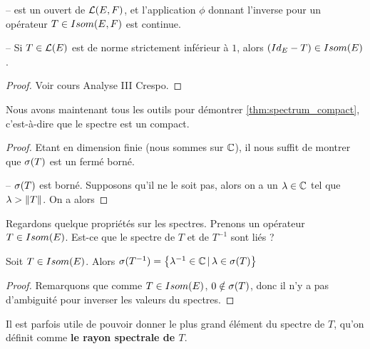 \begin{proposition}
	--  est un ouvert de $\mathcal{L}(E, F)$, et
	l'application $\phi$ donnant l'inverse pour un opérateur $T \in
	Isom(E, F)$ est continue.

	-- Si $T \in \mathcal{L}(E)$ est de norme strictement inférieur à $1$,
	alors $(Id_{E} - T) \in Isom(E)$.
\end{proposition}

\begin{proof}
	Voir cours Analyse III Crespo.
\end{proof}

Nous avons maintenant tous les outils pour démontrer
\ref{thm:spectrum_compact}, c'est-à-dire que le spectre est un compact.

\begin{proof}
	Etant en dimension finie (nous sommes sur $\mathbb{C}$), il nous suffit de
	montrer que $\sigma(T)$ est un fermé borné.

	-- $\sigma(T)$ est borné. Supposons qu'il ne le soit pas, alors on a un
	$\lambda \in \mathbb{C}$ tel que $\lambda > \norm{T}$. On a alors 
\end{proof}


Regardons quelque propriétés sur les spectres. Prenons un opérateur $T \in
Isom(E)$. Est-ce que le spectre de $T$ et de $T^{-1}$ sont liés ?

\begin{proposition}
	Soit $T \in Isom(E)$. Alors $\sigma(T^{-1}) =
	\left\{\lambda^{-1} \in \mathbb{C} \, | \, \lambda \in \sigma(T) \right\}$
\end{proposition}

\begin{proof}
	Remarquons que comme $T \in Isom(E)$, $0 \notin \sigma(T)$,
	donc il n'y a pas d'ambiguité pour inverser les valeurs du spectres.
\end{proof}

Il est parfois utile de pouvoir donner le plus grand élément du spectre de $T$, qu'on
définit comme \textbf{le rayon spectrale de $T$}.




